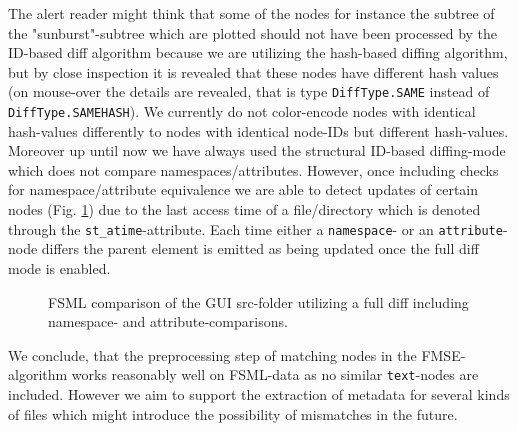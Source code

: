 The alert reader might think that some of the nodes for instance the subtree of the "sunburst"-subtree which are plotted should not have been processed by the ID-based diff algorithm because we are utilizing the hash-based diffing algorithm, but by close inspection it is revealed that these nodes have different hash values (on mouse-over the details are revealed, that is type \texttt{DiffType.SAME} instead of \texttt{DiffType.SAMEHASH}). We currently do not color-encode nodes with identical hash-values differently to nodes with identical node-IDs but different hash-values. Moreover up until now we have always used the structural ID-based diffing-mode which does not compare namespaces/attributes. However, once including checks for namespace/attribute equivalence we are able to detect updates of certain nodes (Fig. \ref{fig:fsml-gui-fulldiff}) due to the last access time of a file/directory which is denoted through the \texttt{st\_atime}-attribute. Each time either a \texttt{namespace}- or an \texttt{attribute}-node differs the parent element is emitted as being updated once the full diff mode is enabled.

\begin{figure}[tb]
\caption{\label{fig:fsml-gui-fulldiff} FSML comparison of the GUI src-folder utilizing a full diff including namespace- and attribute-comparisons.}
\end{figure}

We conclude, that the preprocessing step of matching nodes in the FMSE-algorithm works reasonably well on FSML-data as no similar \texttt{text}-nodes are included. However we aim to support the extraction of metadata for several kinds of files which might introduce the possibility of mismatches in the future.

